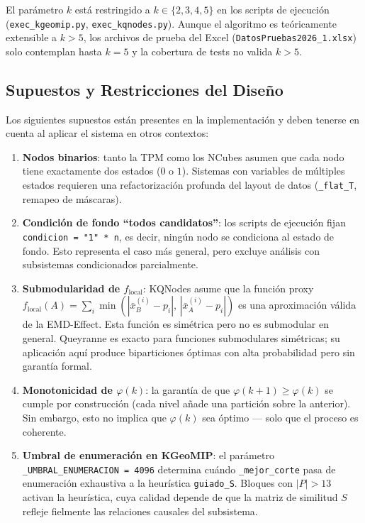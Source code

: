 El parámetro $k$ está restringido a $k \in \{2,3,4,5\}$ en los scripts
de ejecución (\texttt{exec\_kgeomip.py}, \texttt{exec\_kqnodes.py}).
Aunque el algoritmo es teóricamente extensible a $k > 5$, los archivos
de prueba del Excel (\texttt{DatosPruebas2026\_1.xlsx}) solo contemplan
hasta $k=5$ y la cobertura de tests no valida $k > 5$.


\subsection{Supuestos y Restricciones del Diseño}

Los siguientes supuestos están presentes en la implementación y deben
tenerse en cuenta al aplicar el sistema en otros contextos:

\begin{enumerate}
  \item \textbf{Nodos binarios}: tanto la TPM como los NCubes asumen que
        cada nodo tiene exactamente dos estados ($0$ o $1$).
        Sistemas con variables de múltiples estados requieren una
        refactorización profunda del layout de datos (\texttt{\_flat\_T},
        remapeo de máscaras).

  \item \textbf{Condición de fondo ``todos candidatos''}: los scripts de
        ejecución fijan \texttt{condicion = "1" * n}, es decir, ningún
        nodo se condiciona al estado de fondo.
        Esto representa el caso más general, pero excluye análisis con
        subsistemas condicionados parcialmente.

  \item \textbf{Submodularidad de $f_{\text{local}}$}: KQNodes asume que
        la función proxy $f_{\text{local}}(A) = \sum_i \min(|\bar{x}_B^{(i)}
        - p_i|,\, |\bar{x}_A^{(i)} - p_i|)$ es una aproximación válida
        de la EMD-Effect. Esta función es simétrica pero no es submodular
        en general. Queyranne es exacto para funciones submodulares
        simétricas; su aplicación aquí produce biparticiones óptimas con
        alta probabilidad pero sin garantía formal.

  \item \textbf{Monotonicidad de $\varphi(k)$}: la garantía de que
        $\varphi(k+1) \geq \varphi(k)$ se cumple por construcción
        (cada nivel añade una partición sobre la anterior).
        Sin embargo, esto no implica que $\varphi(k)$ sea óptimo — solo
        que el proceso es coherente.

  \item \textbf{Umbral de enumeración en KGeoMIP}: el parámetro
        \texttt{\_UMBRAL\_ENUMERACION = 4096} determina cuándo
        \texttt{\_mejor\_corte} pasa de enumeración exhaustiva a la
        heurística \texttt{guiado\_S}.
        Bloques con $|P| > 13$ activan la heurística, cuya calidad
        depende de que la matriz de similitud $S$ refleje fielmente las
        relaciones causales del subsistema.
\end{enumerate}

